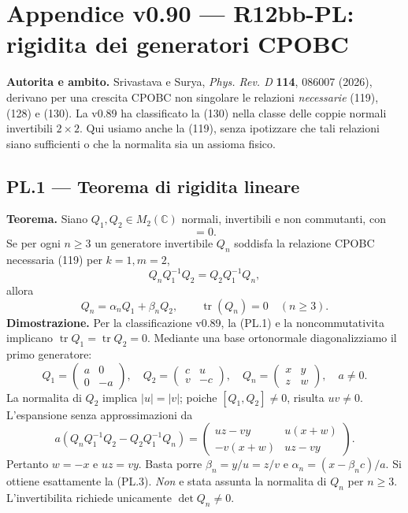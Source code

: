 \documentclass[11pt,a4paper]{article}
\begin{document}
\clearpage
\section*{Appendice v0.90 --- R12bb-PL: rigidita dei generatori CPOBC}
\textbf{Autorita e ambito.} Srivastava e Surya, \emph{Phys. Rev. D} \textbf{114}, 086007 (2026), derivano per una crescita CPOBC non singolare le relazioni \emph{necessarie} (119), (128) e (130). La v0.89 ha classificato la (130) nella classe delle coppie normali invertibili $2\times2$. Qui usiamo anche la (119), senza ipotizzare che tali relazioni siano sufficienti o che la normalita sia un assioma fisico.

\subsection*{PL.1 --- Teorema di rigidita lineare}
\textbf{Teorema.} Siano $Q_1,Q_2\in M_2(\mathbb C)$ normali, invertibili e non commutanti, con
\begin{equation}
[Q_1Q_2^{-1},Q_1^{-1}Q_2]=0.\tag{PL.1}
\end{equation}
Se per ogni $n\ge3$ un generatore invertibile $Q_n$ soddisfa la relazione CPOBC necessaria (119) per $k=1,m=2$,
\begin{equation}
Q_nQ_1^{-1}Q_2=Q_2Q_1^{-1}Q_n,\tag{PL.2}
\end{equation}
allora
\begin{equation}
\boxed{\quad Q_n=\alpha_nQ_1+\beta_nQ_2,\qquad
\operatorname{tr}(Q_n)=0\quad(n\ge3).\quad}\tag{PL.3}
\end{equation}
\textbf{Dimostrazione.} Per la classificazione v0.89, la (PL.1) e la noncommutativita implicano $\operatorname{tr}Q_1=\operatorname{tr}Q_2=0$. Mediante una base ortonormale diagonalizziamo il primo generatore:
\begin{equation}
Q_1=\begin{pmatrix}a&0\\0&-a\end{pmatrix},\quad
Q_2=\begin{pmatrix}c&u\\v&-c\end{pmatrix},\quad
Q_n=\begin{pmatrix}x&y\\z&w\end{pmatrix},\quad a\ne0.\tag{PL.4}
\end{equation}
La normalita di $Q_2$ implica $|u|=|v|$; poiche $[Q_1,Q_2]\ne0$, risulta $uv\ne0$. L'espansione senza approssimazioni da
\begin{equation}
 a\left(Q_nQ_1^{-1}Q_2-Q_2Q_1^{-1}Q_n\right)
 =\begin{pmatrix}uz-vy&u(x+w)\\-v(x+w)&uz-vy\end{pmatrix}.\tag{PL.5}
\end{equation}
Pertanto $w=-x$ e $uz=vy$. Basta porre $\beta_n=y/u=z/v$ e $\alpha_n=(x-\beta_nc)/a$. Si ottiene esattamente la (PL.3). \emph{Non} e stata assunta la normalita di $Q_n$ per $n\ge3$. L'invertibilita richiede unicamente $\det Q_n\ne0$.
\end{document}
